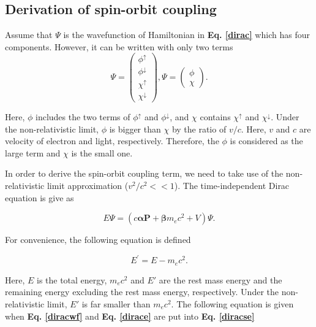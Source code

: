 \documentclass[a4paper, 12pt, titlepage,oneside,drop]{kthesis}
\begin{document}
\subsection{Derivation of spin-orbit coupling}

\noindent  Assume that $\Psi$ is the wavefunction of Hamiltonian in \textbf {Eq. \ref{dirac}} which has four components. However, it can be 
written with only two terms
\begin{equation}\label{diracwf}
\Psi = \left( \begin{array}{c}
\phi^{\uparrow} \\
\phi^{\downarrow} \\
\chi^{\uparrow} \\
\chi^{\downarrow} \end{array} \right),
 \Psi = \left(\begin{array}{c}
\phi \\               
\chi \end{array} \right).
\end{equation}

\noindent Here, $\phi$ includes the two terms of $\phi^{\uparrow}$ and $\phi^{\downarrow}$, and $\chi$ contains  $\chi^{\uparrow}$ and $\chi^{\downarrow}$.
Under the non-relativistic limit, $\phi$ is bigger than $\chi$ by the ratio of $v/c$. Here, $v$ and $c$ are velocity of electron and light, respectively.
Therefore, the $\phi$ is considered as the large term and $\chi$ is the small one.

\noindent In order to derive the spin-orbit coupling term, we need to take use of the non-relativistic limit approximation ($v^2/c^2 << 1$). The time-independent Dirac equation is give as

\begin{equation}\label{diracse}
 E \Psi = (c \boldsymbol{\alpha} \textbf{P} + \boldsymbol{\beta}m_ec^{2} + V) \Psi.
\end{equation}

\noindent For convenience, the following equation is defined

\begin{equation}\label{dirace}
E^{\prime} = E - m_ec^2.
\end{equation}

\noindent Here, $E$ is the total energy, $m_ec^2$ and $E'$ are the rest mass energy and the remaining energy excluding the rest mass energy, respectively. Under the non-relativistic limit, 
$E'$ is far smaller than $m_ec^2$. The following equation is given when \textbf{Eq. \ref{diracwf}} and \textbf{Eq. \ref{dirace}} are put into \textbf{Eq. \ref{diracse}}
\end{document}
